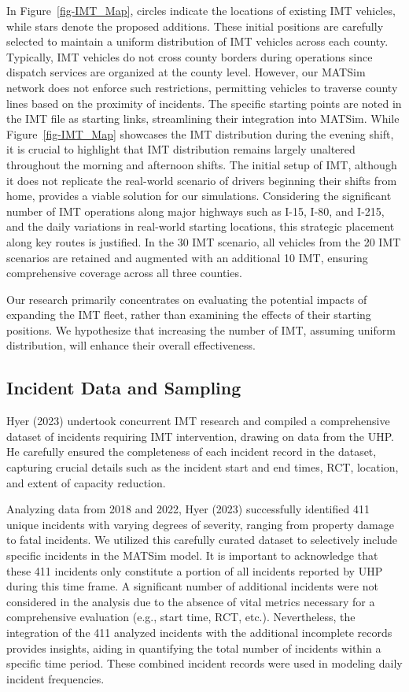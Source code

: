 \documentclass[fancy, oneside, mastersfancy, ms]{byuthesis}
\begin{document}
In Figure~\ref{fig-IMT_Map}, circles indicate the locations of existing
IMT vehicles, while stars denote the proposed additions. These initial
positions are carefully selected to maintain a uniform distribution of
IMT vehicles across each county. Typically, IMT vehicles do not cross
county borders during operations since dispatch services are organized
at the county level. However, our MATSim network does not enforce such
restrictions, permitting vehicles to traverse county lines based on the
proximity of incidents. The specific starting points are noted in the
IMT file as starting links, streamlining their integration into MATSim.
While Figure~\ref{fig-IMT_Map} showcases the IMT distribution during the
evening shift, it is crucial to highlight that IMT distribution remains
largely unaltered throughout the morning and afternoon shifts. The
initial setup of IMT, although it does not replicate the real-world
scenario of drivers beginning their shifts from home, provides a viable
solution for our simulations. Considering the significant number of IMT
operations along major highways such as I-15, I-80, and I-215, and the
daily variations in real-world starting locations, this strategic
placement along key routes is justified. In the 30 IMT scenario, all
vehicles from the 20 IMT scenarios are retained and augmented with an
additional 10 IMT, ensuring comprehensive coverage across all three
counties.

Our research primarily concentrates on evaluating the potential impacts
of expanding the IMT fleet, rather than examining the effects of their
starting positions. We hypothesize that increasing the number of IMT,
assuming uniform distribution, will enhance their overall effectiveness.

\hypertarget{sec-inc_data}{%
\subsection{Incident Data and Sampling}\label{sec-inc_data}}

Hyer (2023) undertook concurrent IMT research and compiled a
comprehensive dataset of incidents requiring IMT intervention, drawing
on data from the UHP. He carefully ensured the completeness of each
incident record in the dataset, capturing crucial details such as the
incident start and end times, RCT, location, and extent of capacity
reduction.

Analyzing data from 2018 and 2022, Hyer (2023) successfully identified
411 unique incidents with varying degrees of severity, ranging from
property damage to fatal incidents. We utilized this carefully curated
dataset to selectively include specific incidents in the MATSim model.
It is important to acknowledge that these 411 incidents only constitute
a portion of all incidents reported by UHP during this time frame. A
significant number of additional incidents were not considered in the
analysis due to the absence of vital metrics necessary for a
comprehensive evaluation (e.g., start time, RCT, etc.). Nevertheless,
the integration of the 411 analyzed incidents with the additional
incomplete records provides insights, aiding in quantifying the total
number of incidents within a specific time period. These combined
incident records were used in modeling daily incident frequencies.
\end{document}
